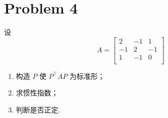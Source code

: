 \section*{Problem 4}

设
\[
A =
\begin{bmatrix}
    2 & -1 & 1 \\
    -1 & 2 & -1 \\
    1 & -1 & 0 \\
\end{bmatrix}
\]
\begin{enumerate}
    \item 构造 $P$ 使 $P^\top A P$ 为标准形；
    \item 求惯性指数；
    \item 判断是否正定.
\end{enumerate}

